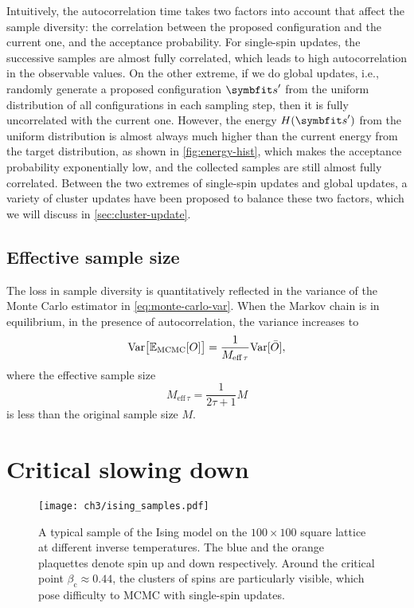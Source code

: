 Intuitively, the autocorrelation time takes two factors into account that affect the sample diversity: the correlation between the proposed configuration and the current one, and the acceptance probability. For single-spin updates, the successive samples are almost fully correlated, which leads to high autocorrelation in the observable values. On the other extreme, if we do global updates, i.e., randomly generate a proposed configuration $\vs'$ from the uniform distribution of all configurations in each sampling step, then it is fully uncorrelated with the current one. However, the energy $H(\vs')$ from the uniform distribution is almost always much higher than the current energy from the target distribution, as shown in \cref{fig:energy-hist}, which makes the acceptance probability exponentially low, and the collected samples are still almost fully correlated. Between the two extremes of single-spin updates and global updates, a variety of cluster updates have been proposed to balance these two factors, which we will discuss in \cref{sec:cluster-update}.

\subsection{Effective sample size}

The loss in sample diversity is quantitatively reflected in the variance of the Monte Carlo estimator in \cref{eq:monte-carlo-var}. When the Markov chain is in equilibrium, in the presence of autocorrelation, the variance increases to
\begin{equation}
\mathrm{Var}\big[ \mathbb{E}_\text{MCMC}[O] \big] = \frac{1}{M_{\text{eff}\,\tau}} \mathrm{Var}[\bar{O}],
\end{equation}
where the effective sample size
\begin{equation}
M_{\text{eff}\,\tau} = \frac{1}{2 \tau + 1} M
\label{eq:eff-sample-size}
\end{equation}
is less than the original sample size $M$.

\section{Critical slowing down}
\label{sec:critical-slow}

\begin{figure}[htb]
\centering
\texttt{[image: ch3/ising\_samples.pdf]}
\caption[Sample of Ising model at different temperatures]{
A typical sample of the Ising model on the $100 \times 100$ square lattice at different inverse temperatures. The blue and the orange plaquettes denote spin up and down respectively. Around the critical point $\beta_\text{c} \approx 0.44$, the clusters of spins are particularly visible, which pose difficulty to MCMC with single-spin updates.
}
\label{fig:ising-samples}
\end{figure}

